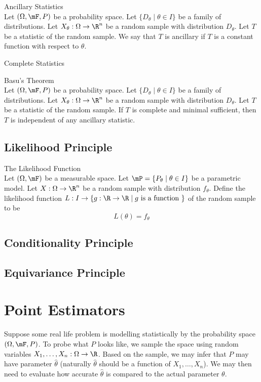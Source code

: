 \documentclass[a4paper]{article}
\begin{document}
\begin{defn}{Ancillary Statistics}{}\\
Let $(\Omega,\mF,P)$ be a probability space. Let $\{D_\theta\;|\;\theta\in I\}$ be a family of distributions. Let $X_\theta:\Omega\to\R^n$ be a random sample with distribution $D_\theta$. Let $T$ be a statistic of the random sample. We say that $T$ is ancillary if $T$ is a constant function with respect to $\theta$. 
\end{defn}

\begin{defn}{Complete Statistics}{}
\end{defn}

\begin{thm}{Basu's Theorem}{}\\
Let $(\Omega,\mF,P)$ be a probability space. Let $\{D_\theta\;|\;\theta\in I\}$ be a family of distributions. Let $X_\theta:\Omega\to\R^n$ be a random sample with distribution $D_\theta$. Let $T$ be a statistic of the random sample. If $T$ is complete and minimal sufficient, then $T$ is independent of any ancillary statistic. 
\end{thm}

\subsection{Likelihood Principle}
\begin{defn}{The Likelihood Function}{}\\
Let $(\Omega,\mF)$ be a measurable space. Let $\mP=\{P_\theta\;|\;\theta\in I\}$ be a parametric model. Let $X:\Omega\to\R^n$ be a random sample with distribution $f_\theta$. Define the likelihood function $L:I\to\{g:\R\to\R\;|\;g\text{ is a function }\}$ of the random sample to be $$L(\theta)=f_\theta$$
\end{defn}

\subsection{Conditionality Principle}

\subsection{Equivariance Principle}

\pagebreak
\section{Point Estimators}
Suppose some real life problem is modelling statistically by the probability space $(\Omega,\mF,P)$. To probe what $P$ looks like, we sample the space using random variables $X_1,\dots,X_n:\Omega\to\R$. Based on the sample, we may infer that $P$ may have parameter $\widehat{\theta}$ (naturally $\widehat{\theta}$ should be a function of $X_1,\dots,X_n$). We may then need to evaluate how accurate $\widehat{\theta}$ is compared to the actual parameter $\theta$. \\
\end{document}
